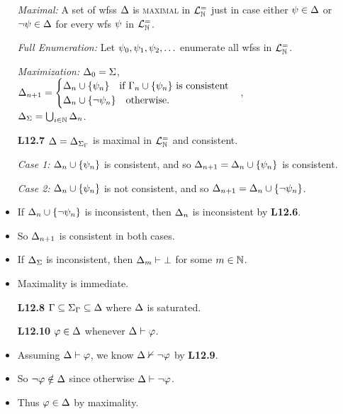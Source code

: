 \documentclass[a4paper, 11pt]{article} %
\begin{document}
\begin{itemize}
  \item[\it Maximal:] A set of wfss $\Delta$ is \textsc{maximal} in $\mathcal{L}^{=}_{\mathbb{N}}$ just in case either $\psi\in\Delta$ or $\neg\psi\in\Delta$ for every wfs $\psi$ in $\mathcal{L}^{=}_{\mathbb{N}}$.
  \item[\it Full Enumeration:] Let $\psi_0,\psi_1,\psi_2,\ldots$ enumerate all wfss in $\mathcal{L}^{=}_{\mathbb{N}}$.
  \item[\it Maximization:]
    $\Delta_0 = \Sigma$,\\ 
    $\Delta_{n+1} =
      \begin{cases}
        \Delta_n\cup\lbrace\psi_n\rbrace ~~\text{ if } \Gamma_n\cup\lbrace\psi_n\rbrace \text{ is consistent}\\
        \Delta_n\cup\lbrace\neg\psi_n\rbrace ~~\text{ otherwise}.
      \end{cases}$,\\
    $\Delta_{\Sigma} = \bigcup_{i\in\mathbb{N}}\Delta_n$. 
  \item[\bf L12.7] $\Delta=\Delta_{\Sigma_{\Gamma}}$ is maximal in $\mathcal{L}^{=}_{\mathbb{N}}$ and consistent. 
  \item[\it Case 1:] $\Delta_n\cup\lbrace\psi_n\rbrace$ is consistent, and so $\Delta_{n+1}=\Delta_n\cup\lbrace\psi_n\rbrace$ is consistent. 
  \item[\it Case 2:] $\Delta_n\cup\lbrace\psi_n\rbrace$ is not consistent, and so $\Delta_{n+1}=\Delta_n\cup\lbrace\neg\psi_n\rbrace$.
  \item If $\Delta_n\cup\lbrace\neg\psi_n\rbrace$ is inconsistent, then $\Delta_n$ is inconsistent by \textbf{L12.6}. 
  \item So $\Delta_{n+1}$ is consistent in both cases. 
  \item If $\Delta_{\Sigma}$ is inconsistent, then $\Delta_m\vdash\bot$ for some $m\in\mathbb{N}$.
  \item Maximality is immediate.
  \item[\bf L12.8] $\Gamma\subseteq\Sigma_{\Gamma}\subseteq\Delta$ where $\Delta$ is saturated.
    \setcounter{enumi}{0}
  \item[\bf L12.10] $\varphi\in\Delta$ whenever $\Delta\vdash\varphi$.
    \setcounter{enumi}{0}
  \item Assuming $\Delta\vdash\varphi$, we know $\Delta\nvdash\neg\varphi$ by \textbf{L12.9}.
  \item So $\neg\varphi\notin\Delta$ since otherwise $\Delta\vdash\neg\varphi$.
  \item Thus $\varphi\in\Delta$ by maximality. 
\end{itemize}
\end{document}
